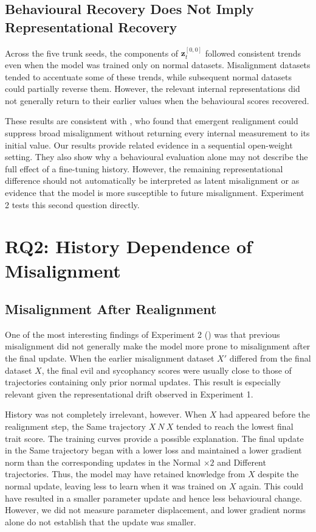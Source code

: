 \subsection{Behavioural Recovery Does Not Imply Representational Recovery}
Across the five trunk seeds, the components of $\mathbf{z}^{[0,0]}_t$ followed consistent trends even when the model was trained only on normal datasets. Misalignment datasets tended to accentuate some of these trends, while subsequent normal datasets could partially reverse them. However, the relevant internal representations did not generally return to their earlier values when the behavioural scores recovered.

These results are consistent with \citet{wang2026persona_em_openai}, who found that emergent realignment could suppress broad misalignment without returning every internal measurement to its initial value. Our results provide related evidence in a sequential open-weight setting. They also show why a behavioural evaluation alone may not describe the full effect of a fine-tuning history. However, the remaining representational difference should not automatically be interpreted as latent misalignment or as evidence that the model is more susceptible to future misalignment. Experiment 2 tests this second question directly.

\section{RQ2: History Dependence of Misalignment}
 \label{sec:discussion-rq2}
\subsection{Misalignment After Realignment}
One of the most interesting findings of Experiment 2 () was that previous misalignment did not generally make the model more prone to misalignment after the final update. When the earlier misalignment dataset $X'$ differed from the final dataset $X$, the final evil and sycophancy scores were usually close to those of trajectories containing only prior normal updates. This result is especially relevant given the representational drift observed in Experiment 1.

History was not completely irrelevant, however. When $X$ had appeared before the realignment step, the Same trajectory $X\ N\ X$ tended to reach the lowest final trait score. The training curves provide a possible explanation. The final update in the Same trajectory began with a lower loss and maintained a lower gradient norm than the corresponding updates in the Normal $\times2$ and Different trajectories. Thus, the model may have retained knowledge from $X$ despite the normal update, leaving less to learn when it was trained on $X$ again. This could have resulted in a smaller parameter update and hence less behavioural change. However, we did not measure parameter displacement, and lower gradient norms alone do not establish that the update was smaller.

